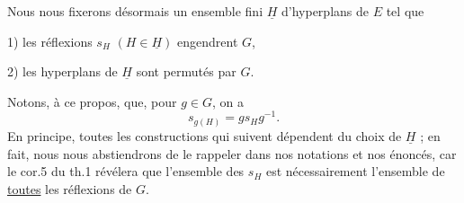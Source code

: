 Nous nous fixerons désormais un ensemble fini $\underline{H}$ d'hyperplans de $E$ tel que

1) les réflexions $s_H$ $(H\in\underline{H})$ engendrent $G$,

2) les hyperplans de $\underline{H}$ sont permutés par $G$.

Notons, à ce propos, que, pour $g\in G$, on a
\[
s_{g(H)}=gs_Hg^{-1}.
\tag*{(1)}
\]
En principe, toutes les constructions qui suivent dépendent du choix de $\underline{H}$ ; en fait, nous nous abstiendrons de le rappeler dans nos notations et nos énoncés, car le cor.5 du th.1 révélera que l'ensemble des $s_H$ est nécessairement l'ensemble de \uline{toutes} les réflexions de $G$.
